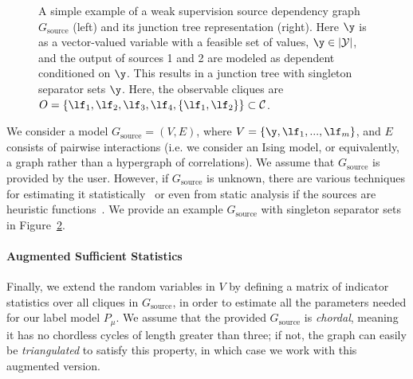 \documentclass[letterpaper]{article}
\begin{document}
\begin{appendix}
\begin{figure}
\begin{subfigure}{.5\textwidth}
		\label{fig:g-source-jt-appendix}
	\end{subfigure}\caption{
		A simple example of a weak supervision source dependency graph $G_{\text{source}}$ (left) and its junction tree representation (right).
		Here $\y$ is as a vector-valued variable with a feasible set of values, $\y \in |\mathcal{Y}|$, and the output of sources 1 and 2 are modeled as dependent conditioned on $\y$.
		This results in a junction tree with singleton separator sets $\y$.
		Here, the observable cliques are $O = \{\lf_1,\lf_2,\lf_3,\lf_4,\{\lf_1,\lf_2\}\} \subset \mathcal{C}$.
	}
	\label{fig:g-source-example-appendix}
\end{figure}

We consider a model $G_{\text{source}} = (V, E)$, where $V = \{ \y, \lf_1,...,\lf_m \}$, and $E$ consists of pairwise interactions (i.e. we consider an Ising model, or equivalently, a graph rather than a hypergraph of correlations).
We assume that $G_{\text{source}}$ is provided by the user.
However, if $G_{\text{source}}$ is unknown, there are various techniques for estimating it statistically~\cite{bach2017learning} or even from static analysis if the sources are heuristic functions~\cite{varma2017inferring}.
We provide an example $G_{\text{source}}$ with singleton separator sets in Figure~\ref{fig:g-source-example-appendix}.

\paragraph*{Augmented Sufficient Statistics}
Finally, we extend the random variables in $V$ by defining a matrix of indicator statistics over all cliques in $G_{\text{source}}$, in order to estimate all the parameters needed for our label model $P_\mu$.
We assume that the provided $G_{\text{source}}$ is \textit{chordal}, meaning it has no chordless cycles of length greater than three; if not, the graph can easily be \emph{triangulated} to satisfy this property, in which case we work with this augmented version.


\end{appendix}
\end{document}
